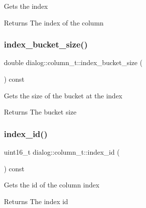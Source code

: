 Gets the index \begin{DoxyReturn}{Returns}
The index of the column 
\end{DoxyReturn}
\mbox{\label{classdialog_1_1column__t_aa43ce56355c469f098ebb2c5ee7d6ab9}} 
\subsubsection{\texorpdfstring{index\+\_\+bucket\+\_\+size()}{index\_bucket\_size()}}
{\footnotesize\ttfamily double dialog\+::column\+\_\+t\+::index\+\_\+bucket\+\_\+size (\begin{DoxyParamCaption}{ }\end{DoxyParamCaption}) const\hspace{0.3cm}{\ttfamily [inline]}}

Gets the size of the bucket at the index \begin{DoxyReturn}{Returns}
The bucket size 
\end{DoxyReturn}
\mbox{\label{classdialog_1_1column__t_ac82b68223d597e807ac5bd4f5056b0c8}} 
\subsubsection{\texorpdfstring{index\+\_\+id()}{index\_id()}}
{\footnotesize\ttfamily uint16\+\_\+t dialog\+::column\+\_\+t\+::index\+\_\+id (\begin{DoxyParamCaption}{ }\end{DoxyParamCaption}) const\hspace{0.3cm}{\ttfamily [inline]}}

Gets the id of the column index \begin{DoxyReturn}{Returns}
The index id 
\end{DoxyReturn}
\mbox{\label{classdialog_1_1column__t_a61f7a157a27f4fa3d4a801db035e2166}} 
